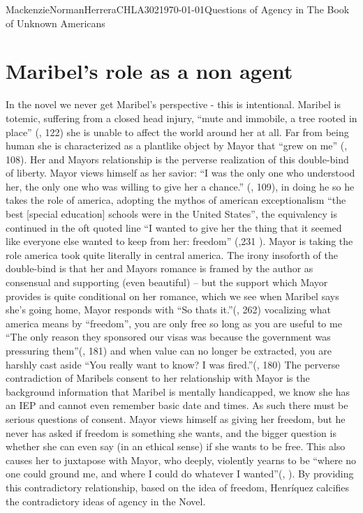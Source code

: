 \documentclass{article}
\begin{document}
\begin{mla}{Mackenzie}{Norman}{Herrera}{CHLA302}{\today}{Questions of Agency in The Book of Unknown Americans}
\section*{Maribel’s role as a non agent}
In the novel we never get Maribel's perspective - this is intentional. Maribel is totemic, suffering from a closed head injury,  ``mute and immobile, a tree rooted in place'' (\cite{Henriquez2014-sh}, 122) she is unable to affect the world around her at all. Far from being human she is characterized as a plantlike object by Mayor that ``grew on me'' (\cite{Henriquez2014-sh}, 108). Her and Mayors relationship is the perverse realization of this double-bind of liberty. Mayor views himself as her savior: ``I was the only one who understood her, the only one who was willing to give her a chance.'' (\cite{Henriquez2014-sh}, 109), in doing he so he takes the role of america, adopting the mythos of american exceptionalism ``the best [special education] schools were in the United States'', the equivalency is continued in the oft quoted line ``I wanted to give her the thing that it seemed like everyone else wanted to keep from her: freedom'' (\cite{Henriquez2014-sh},231 ). Mayor is taking the role america took quite literally in central america. The irony insoforth of the double-bind is that her and Mayors romance is framed by the author as consensual and supporting (even beautiful) -- but the support which Mayor provides is quite conditional on her romance, which we see when Maribel says she's going home, Mayor responds with ``So thats it.''(\cite{Henriquez2014-sh}, 262) vocalizing what america means by ``freedom'', you are only free so long as you are useful to me ``The only reason they sponsored our visas was because the government was pressuring them''(\cite{Henriquez2014-sh}, 181) and when value can no longer be extracted, you are harshly cast aside ``You really want to know? I was fired.''(\cite{Henriquez2014-sh}, 180) The perverse contradiction of Maribels consent to her relationship with Mayor is the background information that Maribel is mentally handicapped, we know she has an IEP and cannot even remember basic date and times. As such there must be serious questions of consent. Mayor views himself as giving her freedom, but he never has asked if freedom is something she wants, and the bigger question is whether she can even say (in an ethical sense) if she wants to be free. This also causes her to juxtapose with Mayor, who deeply, violently yearns to be ``where no one could ground me, and where I could do whatever I wanted''(\cite{Henriquez2014-sh}, ). By providing this contradictory relationship, based on the idea of freedom, Henríquez calcifies the contradictory ideas of agency in the Novel.

\end{mla}
\end{document}
